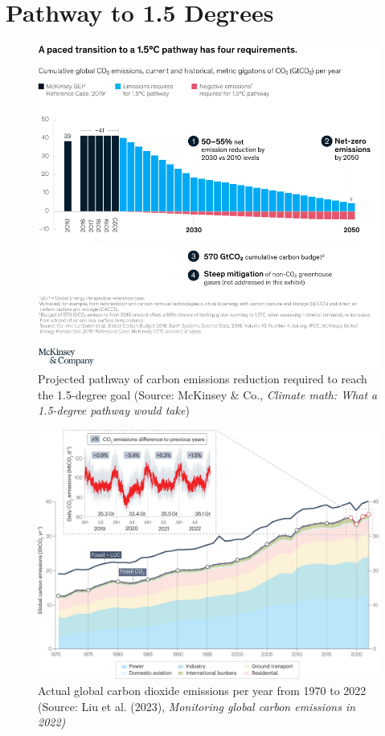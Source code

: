\chapter{Pathway to 1.5 Degrees}
\begin{figure}[ht!]
    \includegraphics[width=\textwidth]{figures/pathway.png}
    \caption[Projected pathway of carbon emissions reduction required to reach the 1.5-degree goal]{Projected pathway of carbon emissions reduction required to reach the 1.5-degree goal (Source: McKinsey \& Co., \textit{Climate math: What a 1.5-degree pathway would take})}
\end{figure}
\begin{figure}[ht!]
    \includegraphics[width=\textwidth]{figures/emissions.png}
    \caption[Actual global carbon dioxide emissions per year from 1900 to 2022]{Actual global carbon dioxide emissions per year from 1970 to 2022 (Source: Liu et al. (2023), \textit{Monitoring global carbon emissions in 2022)}}
\end{figure}

